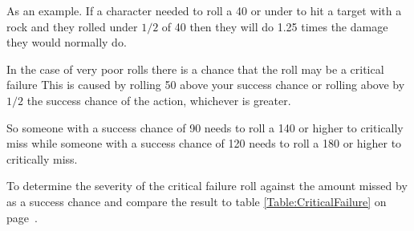 As an example. If a character needed to roll a 40 or under to hit a target 
with a rock and they rolled under $ 1/2 $ of 40 then they will do 1.25
times the damage they would normally do.

In the case of very poor rolls there is a chance that the roll  
may be a critical failure This is caused by rolling 50 above your success chance or 
rolling above by $ 1/2 $ the success chance of the action, whichever is greater.

So someone with a success chance of 90 needs to roll a 140 or higher to
critically miss while someone with a success chance of 120 needs to roll a
180 or higher to critically miss.

To determine the severity of the critical failure roll against the 
amount missed by as a success chance and compare the result to table
\ref{Table:CriticalFailure} on page~\pageref{Table:CriticalFailure}.



